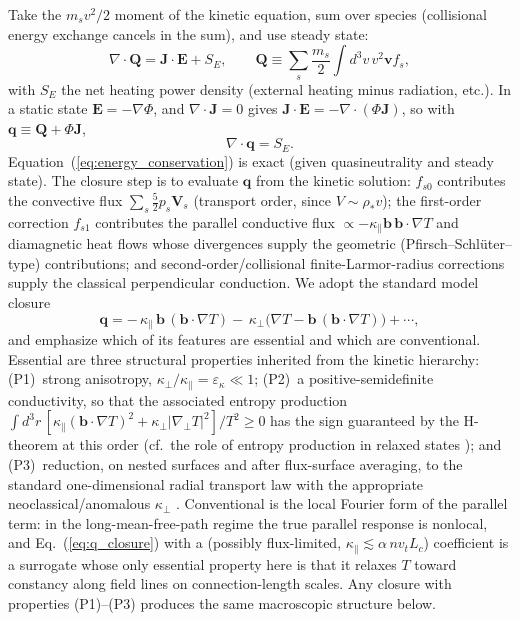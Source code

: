 \documentclass[english]{article}
\newcommand{\bJ}{\mathbf{J}}
\newcommand{\bb}{\mathbf{b}}
\newcommand{\bv}{\mathbf{v}}
\newcommand{\bE}{\mathbf{E}}
\newcommand{\bV}{\mathbf{V}}
\newcommand{\gradperp}{\nabla_{\!\perp}}
\begin{document}
Take the $m_sv^2/2$ moment of the kinetic equation, sum over species (collisional energy exchange
cancels in the sum), and use steady state:
\begin{equation}
\nabla\cdot\mathbf{Q}=\bJ\cdot\bE+S_E,
\qquad
\mathbf{Q}\equiv\sum_s\frac{m_s}{2}\int d^3v\,v^{2}\bv f_s ,
\label{eq:energy_moment}
\end{equation}
with $S_E$ the net heating power density (external heating minus radiation, etc.). In a static
state $\bE=-\nabla\Phi$, and $\nabla\cdot\bJ=0$ gives $\bJ\cdot\bE=-\nabla\cdot(\Phi\bJ)$, so with
$\mathbf{q}\equiv\mathbf{Q}+\Phi\bJ$,
\begin{equation}
\nabla\cdot\mathbf{q}=S_E .
\label{eq:energy_conservation}
\end{equation}
Equation~(\ref{eq:energy_conservation}) is exact (given quasineutrality and steady state). The
closure step is to evaluate $\mathbf{q}$ from the kinetic solution: $f_{s0}$ contributes the
convective flux $\sum_s\tfrac{5}{2}p_s\bV_s$ (transport order, since $V\sim\rho_*v$); the
first-order correction $f_{s1}$ contributes the parallel conductive flux
$\propto-\kappa_\parallel\bb\,\bb\cdot\nabla T$ and diamagnetic heat flows whose divergences
supply the geometric (Pfirsch--Schl\"uter--type) contributions; and second-order/collisional
finite-Larmor-radius corrections supply the classical perpendicular conduction. We adopt the
standard model closure
\begin{equation}
\mathbf{q}=-\,\kappa_\parallel\,\bb\,(\bb\cdot\nabla T)
-\,\kappa_\perp\big(\nabla T-\bb\,(\bb\cdot\nabla T)\big)+\cdots ,
\label{eq:q_closure}
\end{equation}
and emphasize which of its features are essential and which are conventional. Essential are three
structural properties inherited from the kinetic hierarchy: (P1)~strong anisotropy,
$\kappa_\perp/\kappa_\parallel=\varepsilon_\kappa\ll1$; (P2)~a positive-semidefinite conductivity,
so that the associated entropy production
$\int d^3r\,[\kappa_\parallel(\bb\cdot\nabla T)^{2}+\kappa_\perp|\gradperp T|^{2}]/T^{2}\ge0$ has
the sign guaranteed by the H-theorem at this order (cf.\ the role of entropy production in relaxed
states \cite{hameiri1987}); and (P3)~reduction, on nested surfaces and after flux-surface
averaging, to the standard one-dimensional radial transport law with the appropriate
neoclassical/anomalous $\kappa_\perp$ \cite{helander_sigmar}. Conventional is the local Fourier
form of the parallel term: in the long-mean-free-path regime the true parallel response is
nonlocal, and Eq.~(\ref{eq:q_closure}) with a (possibly flux-limited,
$\kappa_\parallel\lesssim\alpha\,n v_t L_c$) coefficient is a surrogate whose only essential
property here is that it relaxes $T$ toward constancy along field lines on connection-length
scales. Any closure with properties (P1)--(P3) produces the same macroscopic structure below.
\end{document}

